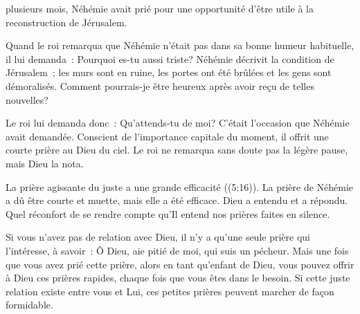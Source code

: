 \dvrule






 plusieurs mois, Néhémie avait prié
 pour une opportunité d'être utile à la reconstruction de Jérusalem.

Quand le roi remarqua que Néhémie n'était pas dans sa bonne humeur habituelle,
 il lui demanda~: \og Pourquoi es-tu aussi triste? \fg{}
 Néhémie décrivit la condition de Jérusalem~; les murs sont en ruine,
 les portes ont été brûlées et les gens sont démoralisés.
 \og Comment pourrais-je être heureux après avoir reçu de telles nouvelles? \fg{}

Le roi lui demanda donc~: \og Qu'attends-tu de moi? \fg{}
 C'était l'occasion que Néhémie avait demandée.
 Conscient de l'importance capitale du moment,
 il offrit une courte prière au Dieu du ciel.
 Le roi ne remarqua sans doute pas la légère pause, mais Dieu la nota.


\og La prière agissante du juste a une grande efficacité \fg{}
 ((5:16)).
 La prière de Néhémie a dû être courte et muette, mais elle a été efficace.
 Dieu a entendu et a répondu.
 Quel réconfort de se rendre compte qu'Il entend nos prières faites en silence.

Si vous n'avez pas de relation avec Dieu, il n'y a qu'une seule prière
 qui l'intéresse, à savoir~:
 \og Ô Dieu, aie pitié de moi, qui suis un pécheur. \fg{}
 Mais une fois que vous avez prié cette prière, alors en tant qu'enfant de Dieu,
 vous pouvez offrir à Dieu ces prières rapides,
 chaque fois que vous êtes dans le besoin.
 Si cette juste relation existe entre vous et Lui,
 ces petites prières peuvent marcher de façon formidable. 

\dvrule




